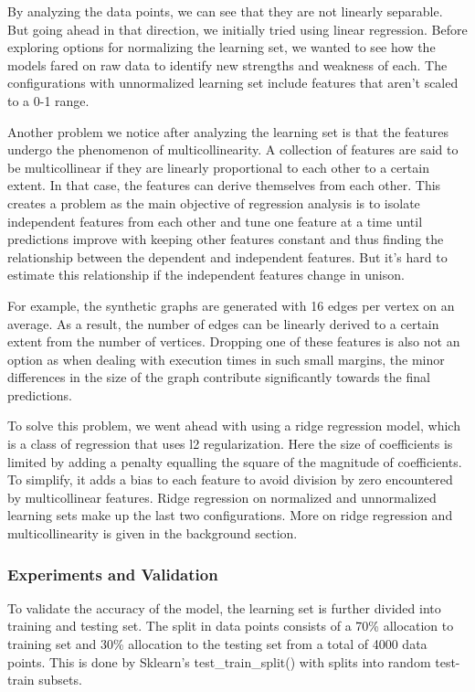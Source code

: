 By analyzing the data points, we can see that they are not linearly separable. But going ahead in that direction, we initially tried using linear regression. Before exploring options for normalizing the learning set, we wanted to see how the models fared on raw data to identify new strengths and weakness of each. The configurations with unnormalized learning set include features that aren't scaled to a 0-1 range.

Another problem we notice after analyzing the learning set is that the features undergo the phenomenon of multicollinearity. A collection of features are said to be multicollinear if they are linearly proportional to each other to a certain extent. In that case, the features can derive themselves from each other. This creates a problem as the main objective of regression analysis is to isolate independent features from each other and tune one feature at a time until predictions improve with keeping other features constant and thus finding the relationship between the dependent and independent features. But it's hard to estimate this relationship if the independent features change in unison. 


For example, the synthetic graphs are generated with 16 edges per vertex on an average. As a result, the number of edges can be linearly derived to a certain extent from the number of vertices. Dropping one of these features is also not an option as when dealing with execution times in such small margins, the minor differences in the size of the graph contribute significantly towards the final predictions.

To solve this problem, we went ahead with using a ridge regression model, which is a class of regression that uses l2 regularization. Here the size of coefficients is limited by adding a penalty equalling the square of the magnitude of coefficients. To simplify, it adds a bias to each feature to avoid division by zero encountered by multicollinear features. Ridge regression on normalized and unnormalized learning sets make up the last two configurations. More on ridge regression and multicollinearity is given in the background section.

\subsubsection{Experiments and Validation}
To validate the accuracy of the model, the learning set is further divided into training and testing set. The split in data points consists of a 70\% allocation to training set and 30\% allocation to the testing set from a total of 4000 data points. This is done by Sklearn's test\_train\_split() with splits into random test-train subsets. 

